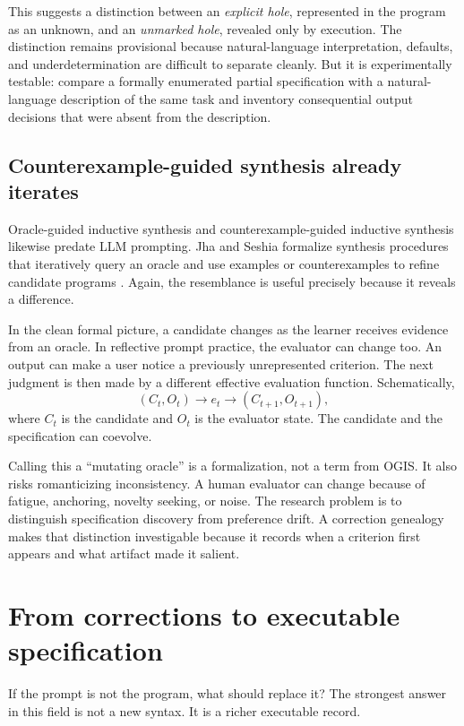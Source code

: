 \documentclass[11pt]{article}
\begin{document}
This suggests a distinction between an \emph{explicit hole}, represented in the program as an unknown, and an \emph{unmarked hole}, revealed only by execution. The distinction remains provisional because natural-language interpretation, defaults, and underdetermination are difficult to separate cleanly. But it is experimentally testable: compare a formally enumerated partial specification with a natural-language description of the same task and inventory consequential output decisions that were absent from the description.

\subsection{Counterexample-guided synthesis already iterates}

Oracle-guided inductive synthesis and counterexample-guided inductive synthesis likewise predate LLM prompting. Jha and Seshia formalize synthesis procedures that iteratively query an oracle and use examples or counterexamples to refine candidate programs \cite{jha2015theory}. Again, the resemblance is useful precisely because it reveals a difference.

In the clean formal picture, a candidate changes as the learner receives evidence from an oracle. In reflective prompt practice, the evaluator can change too. An output can make a user notice a previously unrepresented criterion. The next judgment is then made by a different effective evaluation function. Schematically,
\[
(C_t,O_t) \rightarrow e_t \rightarrow (C_{t+1},O_{t+1}),
\]
where $C_t$ is the candidate and $O_t$ is the evaluator state. The candidate and the specification can coevolve.

Calling this a ``mutating oracle'' is a formalization, not a term from OGIS. It also risks romanticizing inconsistency. A human evaluator can change because of fatigue, anchoring, novelty seeking, or noise. The research problem is to distinguish specification discovery from preference drift. A correction genealogy makes that distinction investigable because it records when a criterion first appears and what artifact made it salient.

\section{From corrections to executable specification}

If the prompt is not the program, what should replace it? The strongest answer in this field is not a new syntax. It is a richer executable record.
\end{document}
